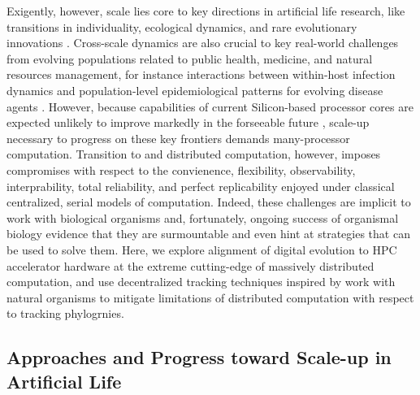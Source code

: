 Exigently, however, scale lies core to key directions in artificial life research, like transitions in individuality, ecological dynamics, and rare evolutionary innovations \citep{CITETODO}.
Cross-scale dynamics are also crucial to key real-world challenges from evolving populations related to public health, medicine, and natural resources management, for instance interactions between within-host infection dynamics and population-level epidemiological patterns for evolving disease agents \citep{TODOCITE}.
However, because capabilities of current Silicon-based processor cores are expected unlikely to improve markedly in the forseeable future \citep{sutter2005free},
scale-up necessary to progress on these key frontiers demands many-processor computation.
Transition to and distributed computation, however, imposes compromises with respect to the convienence, flexibility, observability, interprability, total reliability, and perfect replicability enjoyed under classical centralized, serial models of computation. %
Indeed, these challenges are implicit to work with biological organisms and,
fortunately, ongoing success of organismal biology evidence that they are surmountable and even hint at strategies that can be used to solve them.
Here, we explore alignment of digital evolution to HPC accelerator hardware at the extreme cutting-edge of massively distributed computation, and use decentralized tracking techniques inspired by work with natural organisms to mitigate limitations of distributed computation with respect to tracking phylogrnies.

\subsection{Approaches and Progress toward Scale-up in Artificial Life}

